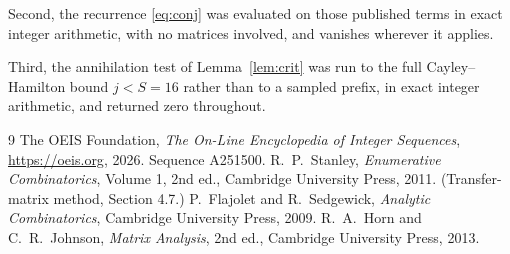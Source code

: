 \documentclass[11pt,a4paper]{article}
\theoremstyle{plain}
\theoremstyle{definition}
\begin{document}
Second, the recurrence \eqref{eq:conj} was evaluated on those published terms in exact
integer arithmetic, with no matrices involved, and vanishes wherever it applies.

Third, the annihilation test of Lemma~\ref{lem:crit} was run to the full Cayley--Hamilton
bound $j<S=16$ rather than to a sampled prefix, in exact integer arithmetic, and returned
zero throughout.

\begin{thebibliography}{9}
 The OEIS Foundation, \emph{The On-Line Encyclopedia of Integer
Sequences}, \url{https://oeis.org}, 2026. Sequence A251500.
 R.~P.~Stanley, \emph{Enumerative Combinatorics}, Volume 1, 2nd ed.,
Cambridge University Press, 2011. (Transfer-matrix method, Section 4.7.)
 P.~Flajolet and R.~Sedgewick, \emph{Analytic Combinatorics}, Cambridge
University Press, 2009.
 R.~A.~Horn and C.~R.~Johnson, \emph{Matrix Analysis}, 2nd ed., Cambridge
University Press, 2013.
\end{thebibliography}
\end{document}

